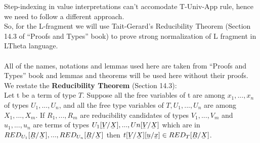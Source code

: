 \documentclass[12pt]{article}
\author{Ankit Kumar}
\newcommand{\ub}[1]{\underaccent{\bar}{#1}}
\begin{document}
Step-indexing in value interpretations can't accomodate T-Univ-App rule, hence we need to follow a different approach.\\
So, for the L-fragment we will use Tait-Gerard's Reducibility Theorem (Section 14.3 of ``Proofs and Types'' book) to prove strong normalization of L fragment in LTheta language.\\
\\
All of the names, notations and lemmas used here are taken from ``Proofs and Types'' book and lemmas and theorems will be used here without their proofs.\\

We restate the \textbf{Reducibility Theorem} (Section 14.3):\\
Let t be a term of type $T$. Suppose all the free variables of t are among $x_1,...,x_n$ of types $U_1,...,U_n$, and all the free type variables of $T,U_1,...,U_n$ are among $X_1,...,X_m$. If $R_1,...,R_m$ are reducibility candidates of types $V_1,...,V_m$ and $u_1,...,u_n$ are terms of types $U_1[\ub{V}/\ub{X}],...,Un[\ub{V}/\ub{X}]$ which are in $RED_{U_1} [\ub{R}/\ub{X}], . . . , RED_{U_n} [\ub{R}/\ub{X}]$ then $t[\ub{V}/\ub{X}][\ub{u}/\ub{x}] \in RED_T[\ub{R}/\ub{X}]$.

\vspace{5mm}
\end{document}
